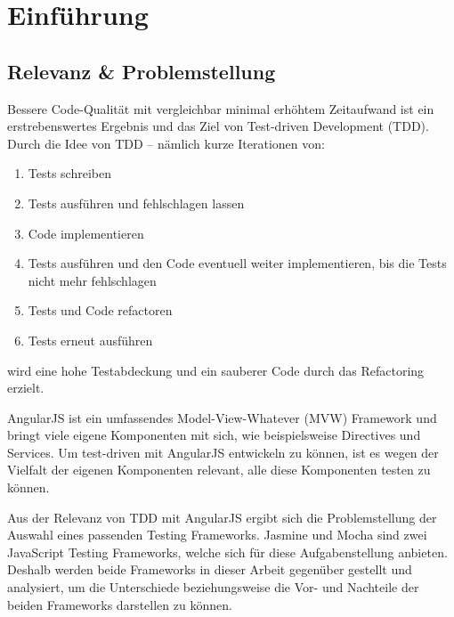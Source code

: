 \section{Einführung}
\label{Einführung}
\subsection{Relevanz \& Problemstellung}
Bessere Code-Qualität mit vergleichbar minimal erhöhtem Zeitaufwand ist ein erstrebenswertes Ergebnis und das Ziel von Test-driven Development (TDD). Durch die Idee von TDD -- nämlich kurze Iterationen von:
\begin{enumerate}
  \item Tests schreiben
  \item Tests ausführen und fehlschlagen lassen
  \item Code implementieren
  \item Tests ausführen und den Code eventuell weiter implementieren, bis die 
  Tests nicht mehr fehlschlagen
  \item Tests und Code refactoren
  \item Tests erneut ausführen
\end{enumerate}
wird eine hohe Testabdeckung und ein sauberer Code durch das Refactoring erzielt.

AngularJS ist ein umfassendes Model-View-Whatever (MVW) Framework und bringt viele eigene Komponenten mit sich, wie beispielsweise Directives und Services. Um test-driven mit AngularJS entwickeln zu können, ist es wegen der Vielfalt der eigenen Komponenten relevant, alle diese Komponenten testen zu können.

Aus der Relevanz von TDD mit AngularJS ergibt sich die Problemstellung der Auswahl eines passenden Testing Frameworks. Jasmine und Mocha sind zwei JavaScript Testing Frameworks, welche sich für diese Aufgabenstellung anbieten. Deshalb werden beide Frameworks in dieser Arbeit gegenüber gestellt und analysiert, um die Unterschiede beziehungsweise die Vor- und Nachteile der beiden Frameworks darstellen zu können.


